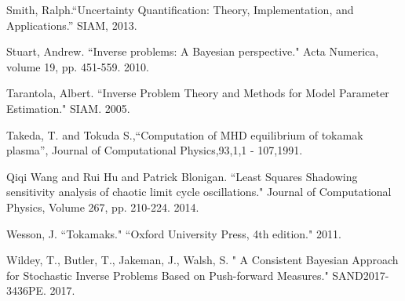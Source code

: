 \documentclass{amsart}
\begin{document}
\begin{thebibliography}{65}
  Smith, Ralph.``Uncertainty Quantification: Theory, Implementation, and Applications.” SIAM, 2013.

 Stuart, Andrew. ``Inverse problems: A Bayesian perspective." Acta Numerica, volume 19, pp. 451-559. 2010.



 Tarantola, Albert. ``Inverse Problem Theory and Methods for Model Parameter Estimation." SIAM. 2005.

 Takeda, T. and Tokuda S.,``Computation of MHD equilibrium of tokamak plasma'',
Journal of Computational Physics,93,1,1 - 107,1991.

 Qiqi Wang and Rui Hu and Patrick Blonigan. ``Least Squares Shadowing sensitivity analysis of chaotic limit cycle oscillations." Journal of Computational Physics, Volume 267, pp. 210-224. 2014.


 Wesson, J. ``Tokamaks." ``Oxford University Press, 4th edition." 2011.

 Wildey, T., Butler, T., Jakeman, J., Walsh, S. " A Consistent Bayesian Approach for Stochastic Inverse Problems Based on Push-forward Measures." SAND2017-3436PE. 2017.


\end{thebibliography}
\end{document}
